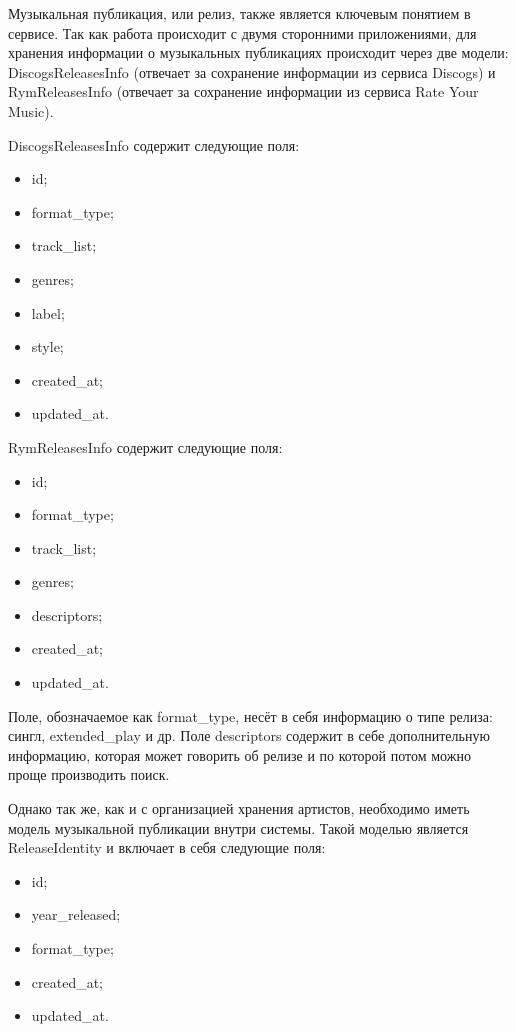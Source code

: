 Музыкальная публикация, или релиз, также является ключевым понятием в сервисе. Так как работа происходит с двумя сторонними приложениями, для хранения информации о музыкальных публикациях происходит через две модели: DiscogsReleasesInfo (отвечает за сохранение информации из сервиса Discogs) и RymReleasesInfo (отвечает за сохранение информации из сервиса Rate Your Music).

DiscogsReleasesInfo содержит следующие поля:

\begin{itemize}
  \item id;
  \item format\_type;
  \item track\_list;
  \item genres;
  \item label;
  \item style;
  \item created\_at;
  \item updated\_at.
\end{itemize}

RymReleasesInfo содержит следующие поля:

\begin{itemize}
  \item id;
  \item format\_type;
  \item track\_list;
  \item genres;
  \item descriptors;
  \item created\_at;
  \item updated\_at.
\end{itemize}

Поле, обозначаемое как format\_type, несёт в себя информацию о типе релиза: сингл, extended\_play и др. Поле descriptors содержит в себе дополнительную информацию, которая может говорить об релизе и по которой потом можно проще производить поиск.

Однако так же, как и с организацией хранения артистов, необходимо иметь модель музыкальной публикации внутри системы. Такой моделью является ReleaseIdentity и включает в себя следующие поля:

\begin{itemize}
  \item id;
  \item year\_released;
  \item format\_type;
  \item created\_at;
  \item updated\_at.
\end{itemize}

